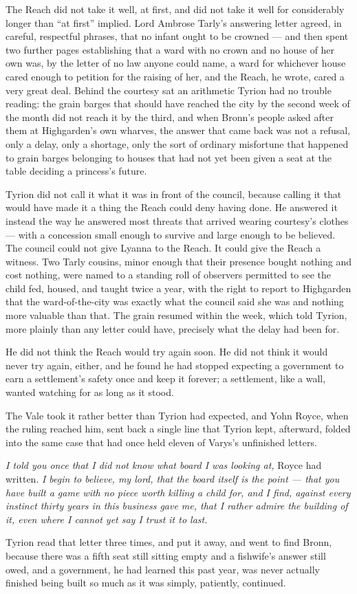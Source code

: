 The Reach did not take it well, at first, and did not take it well for considerably longer than “at first” implied. Lord Ambrose Tarly’s answering letter agreed, in careful, respectful phrases, that no infant ought to be crowned — and then spent two further pages establishing that a ward with no crown and no house of her own was, by the letter of no law anyone could name, a ward for whichever house cared enough to petition for the raising of her, and the Reach, he wrote, cared a very great deal. Behind the courtesy sat an arithmetic Tyrion had no trouble reading: the grain barges that should have reached the city by the second week of the month did not reach it by the third, and when Bronn’s people asked after them at Highgarden’s own wharves, the answer that came back was not a refusal, only a delay, only a shortage, only the sort of ordinary misfortune that happened to grain barges belonging to houses that had not yet been given a seat at the table deciding a princess’s future.

Tyrion did not call it what it was in front of the council, because calling it that would have made it a thing the Reach could deny having done. He answered it instead the way he answered most threats that arrived wearing courtesy’s clothes — with a concession small enough to survive and large enough to be believed. The council could not give Lyanna to the Reach. It could give the Reach a witness. Two Tarly cousins, minor enough that their presence bought nothing and cost nothing, were named to a standing roll of observers permitted to see the child fed, housed, and taught twice a year, with the right to report to Highgarden that the ward-of-the-city was exactly what the council said she was and nothing more valuable than that. The grain resumed within the week, which told Tyrion, more plainly than any letter could have, precisely what the delay had been for.

He did not think the Reach would try again soon. He did not think it would never try again, either, and he found he had stopped expecting a government to earn a settlement’s safety once and keep it forever; a settlement, like a wall, wanted watching for as long as it stood.

The Vale took it rather better than Tyrion had expected, and Yohn Royce, when the ruling reached him, sent back a single line that Tyrion kept, afterward, folded into the same case that had once held eleven of Varys’s unfinished letters.

\textit{I told you once that I did not know what board I was looking at,} Royce had written. \textit{I begin to believe, my lord, that the board itself is the point — that you have built a game with no piece worth killing a child for, and I find, against every instinct thirty years in this business gave me, that I rather admire the building of it, even where I cannot yet say I trust it to last.}

Tyrion read that letter three times, and put it away, and went to find Bronn, because there was a fifth seat still sitting empty and a fishwife’s answer still owed, and a government, he had learned this past year, was never actually finished being built so much as it was simply, patiently, continued.